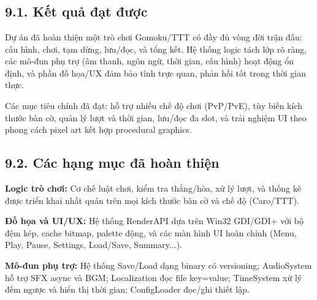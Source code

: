 \newpage
\chapter*{}
\setlength{\parindent}{1.5em}

\section*{9.1. Kết quả đạt được}

\setlength{\parindent}{1.5em} Dự án đã hoàn thiện một trò chơi Gomoku/TTT có đầy đủ vòng đời trận đấu: cấu hình, chơi, tạm dừng, lưu/đọc, và tổng kết. Hệ thống logic tách lớp rõ ràng, các mô-đun phụ trợ (âm thanh, ngôn ngữ, thời gian, cấu hình) hoạt động ổn định, và phần đồ họa/UX đảm bảo tính trực quan, phản hồi tốt trong thời gian thực.

\setlength{\parindent}{1.5em} Các mục tiêu chính đã đạt: hỗ trợ nhiều chế độ chơi (PvP/PvE), tùy biến kích thước bàn cờ, quản lý lượt và thời gian, lưu/đọc đa slot, và trải nghiệm UI theo phong cách pixel art kết hợp procedural graphics.

\section*{9.2. Các hạng mục đã hoàn thiện}

\setlength{\parindent}{1.5em} \textbf{Logic trò chơi:} Cơ chế luật chơi, kiểm tra thắng/hòa, xử lý lượt, và thống kê được triển khai nhất quán trên mọi kích thước bàn cờ và chế độ (Caro/TTT).

\setlength{\parindent}{1.5em} \textbf{Đồ họa và UI/UX:} Hệ thống RenderAPI dựa trên Win32 GDI/GDI+ với bộ đệm kép, cache bitmap, palette động, và các màn hình UI hoàn chỉnh (Menu, Play, Pause, Settings, Load/Save, Summary...).

\setlength{\parindent}{1.5em} \textbf{Mô-đun phụ trợ:} Hệ thống Save/Load dạng binary có versioning; AudioSystem hỗ trợ SFX async và BGM; Localization đọc file key=value; TimeSystem xử lý đếm ngược và hiển thị thời gian; ConfigLoader đọc/ghi thiết lập.

